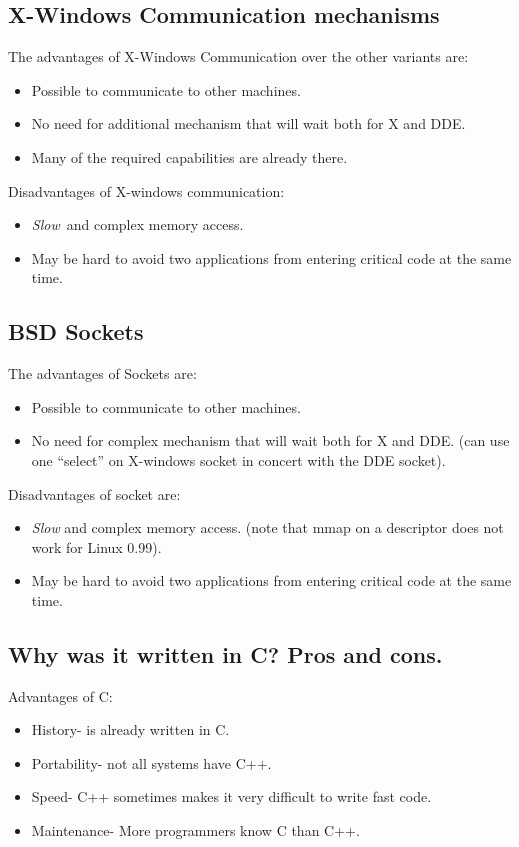 \subsection{X-Windows Communication mechanisms}
The advantages of X-Windows Communication over the other variants are:
\begin{itemize}
  \item Possible to communicate to other machines.
  \item No need for additional mechanism that will wait both for X and DDE\@.
  \item Many of the required capabilities are already there.
\end{itemize}
Disadvantages of X-windows communication:
\begin{itemize}
  \item {\em Slow}\ and complex memory access.
  \item May be hard to avoid two applications from entering critical
    code at the same time.
\end{itemize}

\subsection{BSD Sockets}
The advantages of Sockets are:
\begin{itemize}
  \item Possible to communicate to other machines.
  \item No need for complex mechanism that will wait both for X and
    DDE\@. (can use one ``select'' on X-windows socket in concert with
    the DDE socket).
\end{itemize}
Disadvantages of socket are:
\begin{itemize}
  \item {\em Slow}{} and complex memory access. (note that mmap on a
    descriptor does not work for Linux 0.99).
  \item May be hard to avoid two applications from entering critical
    code at the same time.
\end{itemize}

\subsection{Why was it written in C? Pros and cons.}
Advantages of C:

\begin{itemize}
  \item History- \Wine{} is already written in C.
  \item Portability- not all systems have C++.
  \item Speed- C++ sometimes makes it very difficult to write fast code.
  \item Maintenance- More programmers know C than C++. 
\end{itemize}

